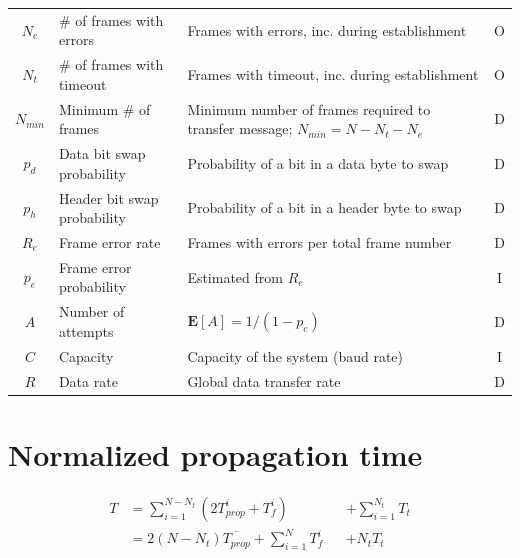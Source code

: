 \documentclass[a4paper, 11pt]{report}
\newcommand\expected[1]{\mathbf{E}[#1]}
\begin{document}
\begin{center}
\begin{tabular}{c | l | p{80mm} | c}
		$N_e$            & \# of frames with errors    & Frames with errors, inc. during establishment                                      & O   \\
		$N_t$            & \# of frames with timeout   & Frames with timeout, inc. during establishment                                     & O   \\
		$N_{min}$        & Minimum \# of frames        & Minimum number of frames required to transfer message; $N_{min} = N-N_t-N_e$       & D   \\
		$p_d$            & Data bit swap probability   & Probability of a bit in a data byte to swap                                        & D   \\
		$p_h$            & Header bit swap probability & Probability of a bit in a header byte to swap                                      & D   \\
		$R_e$            & Frame error rate            & Frames with errors per total frame number                                          & D   \\
		$p_e$            & Frame error probability     & Estimated from $R_e$                                                               & I   \\
		$A$              & Number of attempts          & $\expected{A} = 1/(1-p_e)$                                                         & D   \\
		$C$              & Capacity                    & Capacity of the system (baud rate)                                                 & I   \\
		$R$              & Data rate                   & Global data transfer rate                                                          & D   \\
		\hline \hline
	\end{tabular}
\end{center}

\section{Normalized propagation time}

\begin{equation} \label{eq:T}
\begin{alignedat}{2}
	T & = \sum_{i=1}^{N-N_t}{(2T_{prop}^i + T_f^i)} && + \sum_{i=1}^{N_t}{T_t} \\
	  & = 2 (N-N_t) \overline{T_{prop}} + \sum_{i=1}^{N}{T_f^i} && + N_t T_t
\end{alignedat}
\end{equation}
\end{document}
